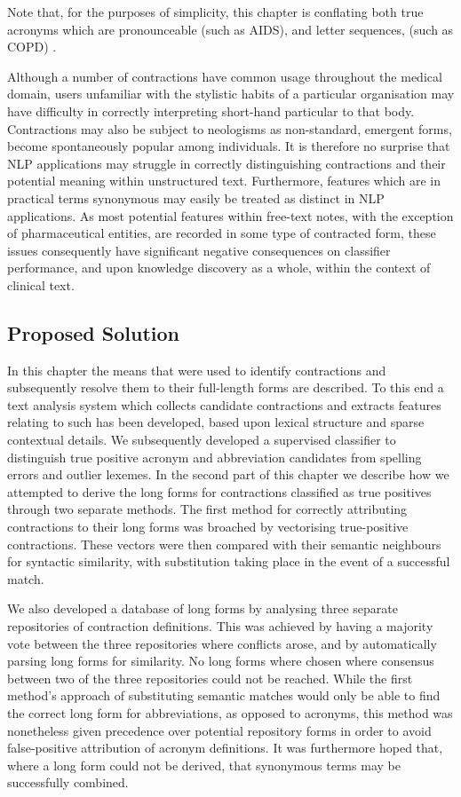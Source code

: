 Note that, for the purposes of simplicity, this chapter is conflating both true acronyms which are pronounceable (such as AIDS), and letter sequences, (such as COPD) \cite{martin2014speech}. 

Although a number of contractions have common usage throughout the medical domain, users unfamiliar with the stylistic habits of a particular organisation may have difficulty in correctly interpreting short-hand particular to that body. Contractions may also be subject to neologisms as non-standard, emergent forms,
become spontaneously popular among individuals. It is therefore no surprise that NLP applications may struggle in correctly distinguishing contractions and their potential meaning within unstructured text. Furthermore, features which are in practical terms synonymous may easily be treated as distinct in NLP applications. As most potential features within free-text notes, with the exception of pharmaceutical entities, are recorded in some type of contracted form, these issues consequently have significant negative consequences on classifier performance, and upon knowledge discovery as a whole, within the context of
clinical text.


\subsection{Proposed Solution}

In this chapter the means that were used to identify contractions and subsequently resolve them to their full-length forms are described. To this end a text analysis system which collects candidate contractions and extracts features relating to such has been developed, based upon lexical structure and sparse
contextual details. We subsequently developed a supervised classifier to distinguish true positive acronym and abbreviation candidates from spelling errors and outlier lexemes. In the second part of this chapter we describe how we attempted to derive the long forms for contractions classified as true positives through two separate methods. The first method for correctly attributing contractions to their long forms was broached by vectorising true-positive contractions. These vectors were then compared with their semantic neighbours for syntactic similarity, with substitution taking place in the event of a successful match.

We also developed a database of long forms by analysing three separate repositories of contraction definitions. This was achieved by having a majority vote between the three repositories where conflicts arose, and by automatically parsing long forms for similarity. No long forms where chosen where consensus
between two of the three repositories could not be reached. While the first method’s approach of substituting semantic matches would only be able to find the correct
long form for abbreviations, as opposed to acronyms, this method was nonetheless given precedence over potential repository forms in order to avoid false-positive attribution of acronym definitions. It was furthermore hoped that, where a long form could not be derived, that synonymous terms may be successfully combined.

